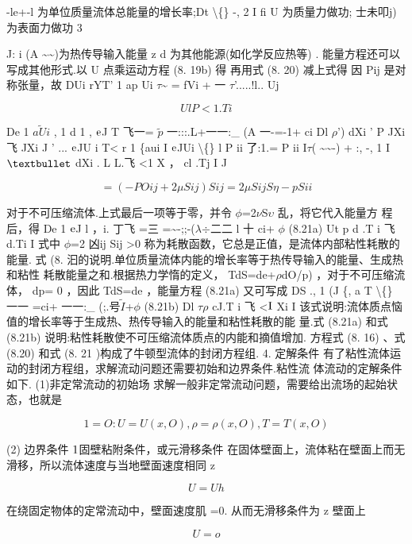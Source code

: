 -le+-l 为单位质量流体总能量的增长率;Dt \textbackslash\{\} -, 2 I fi U 为质量力做功; 士未叩j) 为表面力做功 3

J: i (A \textasciitilde{}\textasciitilde{})为热传导输入能量 z d 为其他能源(如化学反应热等) . 能量方程还可以写成其他形式.以 U 点乘运动方程 (8. 19b) 得 再用式 (8. 20) 减上式得 因 Pij 是对称张量，故 DUi rYT' 1 ap Ui $\tau$\textasciitilde{} = fVi + 一 $\tau$'.....!l.. Uj

\[Ul P <1.Ti\]

De 1 $\tilde{aUi}$ , 1 d 1 , ${\rm e}$J T 飞一= $\tilde{p}$ 一:::.L+一一:\_ (A 一-=-1+ ci Dl $\rho$') dXi ' P JXi 飞 JXi J ' ... ${\rm e}$JU i T< r 1 \{aui I ${\rm e}$JUi \textbackslash\{\} l P ii 了:1.= P ii I$\tau$( \textasciitilde{}\textasciitilde{}-) + :, -, 1 I ${\rm •}$ dXi . L L.飞 <1 X ， cl .Tj I J

\[= (- POij +2\mu Sij )Sij = 2\mu SijS \eta  -pSii\]

对于不可压缩流体.上式最后一项等于零，并令 $\phi$=2$\nu$S$\upsilon$ 乱，将它代入能量方 程后，得 De 1 ${\rm e}$J l ，i. 丁飞 =三 =\textasciitilde{}-;;-($\lambda$$\div$二二 l 十 ci+ $\phi$ (8.21a) Ut p d .T i 飞 d.Ti I 式中 $\phi$=2 凶ij Sij >0 称为耗散函数，它总是正值，是流体内部粘性耗散的能量. 式 (8. 汩的说明.单位质量流体内能的增长率等于热传导输入的能量、生成热和粘性 耗散能量之和.根据热力学惰的定义， TdS=de+$\rho$dO/p) ，对于不可压缩流体， dp= 0 ，因此 TdS=de ，能量方程 (8.21a) 又可写成 DS ., 1 (J \{, a T \textbackslash\{\} 一一 =ci+ 一一:\_ (;.号$\tilde{I}$+$\phi$ (8.21b) Dl $\tau$$\rho$ cJ.T i 飞 <${\rm I}$ Xi I 该式说明:流体质点恼值的增长率等于生成热、热传导输入的能量和粘性耗散的能 量.式 (8.21a) 和式 (8.21b) 说明:粘性耗散使不可压缩流体质点的内能和摘值增加. 方程式 (8. 16) 、式 (8.20) 和式 (8. 21 )构成了牛顿型流体的封闭方程组. 4. 定解条件 有了粘性流体运动的封闭方程组，求解流动问题还需要初始和边界条件.粘性流 体流动的定解条件如下. (1)非定常流动的初始场 求解一般非定常流动问题，需要给出流场的起始状态，也就是

\begin{equation*}1 = O:U = U(x ,  O) ,  \rho =\rho  (x ,  O) ,  T = T(x ,O)\tag{8.22}\end{equation*}

(2) 边界条件 ${\rm 1}$固壁粘附条件，或元滑移条件 在固体壁面上，流体粘在壁面上而无滑移，所以流体速度与当地壁面速度相同 z

\[U = Uh\]

在绕固定物体的定常流动中，壁面速度肌 =0. 从而无滑移条件为 z 壁面上

\[U = o\]


